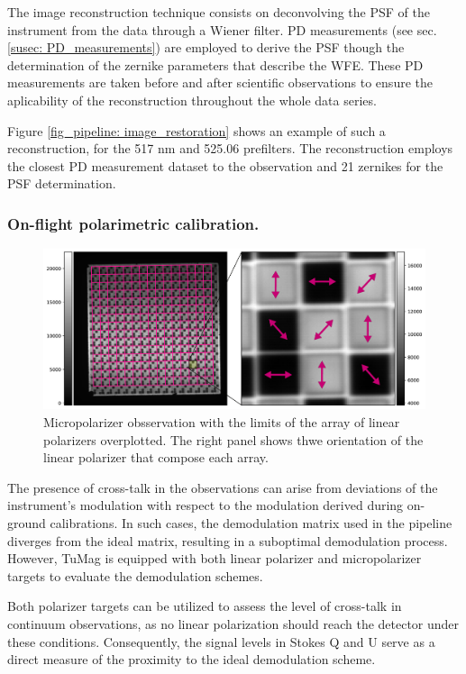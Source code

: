 The image reconstruction technique consists on deconvolving the PSF of the instrument from the data through a Wiener filter. PD measurements (see sec. \ref{susec: PD_measurements}) are employed to derive the PSF though the determination of the zernike parameters that describe the WFE. These PD measurements are taken before and after scientific observations to ensure the aplicability of the reconstruction throughout the whole data series.

Figure \ref{fig_pipeline:  image_restoration} shows an example of such a reconstruction, for the 517 nm and 525.06 prefilters. The reconstruction employs the closest PD measurement dataset to the observation and 21 zernikes for the PSF determination.   

\subsubsection{On-flight polarimetric calibration.}
\begin{figure}[t]
  \includegraphics[width=\textwidth]{figures/Pipeline/Micrpols_edit.pdf}
  \caption[Micropolarizer observations.]{
   Micropolarizer obsservation with the limits of the array of linear polarizers overplotted. The right panel shows thwe orientation of the linear polarizer that compose each array. }
    \label{fig_pipeline: micropols_calib}
\end{figure}
The presence of cross-talk in the observations can arise from deviations of the instrument's modulation with respect to the modulation derived during on-ground calibrations. In such cases, the demodulation matrix used in the pipeline diverges from the ideal matrix, resulting in a suboptimal demodulation process. However, TuMag is equipped with both linear polarizer and micropolarizer targets to evaluate the demodulation schemes.

Both polarizer targets can be utilized to assess the level of cross-talk in continuum observations, as no linear polarization should reach the detector under these conditions. Consequently, the signal levels in Stokes Q and U serve as a direct measure of the proximity to the ideal demodulation scheme.

